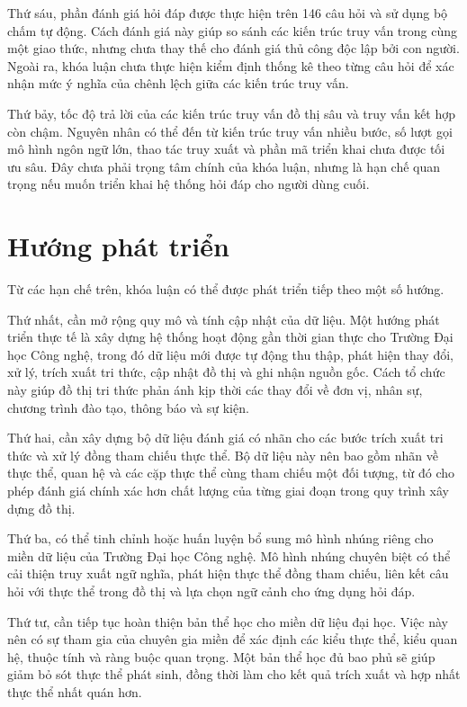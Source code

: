 Thứ sáu, phần đánh giá hỏi đáp được thực hiện trên 146 câu hỏi và sử dụng bộ chấm tự động. Cách đánh giá này giúp so sánh các kiến trúc truy vấn trong cùng một giao thức, nhưng chưa thay thế cho đánh giá thủ công độc lập bởi con người. Ngoài ra, khóa luận chưa thực hiện kiểm định thống kê theo từng câu hỏi để xác nhận mức ý nghĩa của chênh lệch giữa các kiến trúc truy vấn.

Thứ bảy, tốc độ trả lời của các kiến trúc truy vấn đồ thị sâu và truy vấn kết hợp còn chậm. Nguyên nhân có thể đến từ kiến trúc truy vấn nhiều bước, số lượt gọi mô hình ngôn ngữ lớn, thao tác truy xuất và phần mã triển khai chưa được tối ưu sâu. Đây chưa phải trọng tâm chính của khóa luận, nhưng là hạn chế quan trọng nếu muốn triển khai hệ thống hỏi đáp cho người dùng cuối.

\section{Hướng phát triển}

Từ các hạn chế trên, khóa luận có thể được phát triển tiếp theo một số hướng.

Thứ nhất, cần mở rộng quy mô và tính cập nhật của dữ liệu. Một hướng phát triển thực tế là xây dựng hệ thống hoạt động gần thời gian thực cho Trường Đại học Công nghệ, trong đó dữ liệu mới được tự động thu thập, phát hiện thay đổi, xử lý, trích xuất tri thức, cập nhật đồ thị và ghi nhận nguồn gốc. Cách tổ chức này giúp đồ thị tri thức phản ánh kịp thời các thay đổi về đơn vị, nhân sự, chương trình đào tạo, thông báo và sự kiện.

Thứ hai, cần xây dựng bộ dữ liệu đánh giá có nhãn cho các bước trích xuất tri thức và xử lý đồng tham chiếu thực thể. Bộ dữ liệu này nên bao gồm nhãn về thực thể, quan hệ và các cặp thực thể cùng tham chiếu một đối tượng, từ đó cho phép đánh giá chính xác hơn chất lượng của từng giai đoạn trong quy trình xây dựng đồ thị.

Thứ ba, có thể tinh chỉnh hoặc huấn luyện bổ sung mô hình nhúng riêng cho miền dữ liệu của Trường Đại học Công nghệ. Mô hình nhúng chuyên biệt có thể cải thiện truy xuất ngữ nghĩa, phát hiện thực thể đồng tham chiếu, liên kết câu hỏi với thực thể trong đồ thị và lựa chọn ngữ cảnh cho ứng dụng hỏi đáp.

Thứ tư, cần tiếp tục hoàn thiện bản thể học cho miền dữ liệu đại học. Việc này nên có sự tham gia của chuyên gia miền để xác định các kiểu thực thể, kiểu quan hệ, thuộc tính và ràng buộc quan trọng. Một bản thể học đủ bao phủ sẽ giúp giảm bỏ sót thực thể phát sinh, đồng thời làm cho kết quả trích xuất và hợp nhất thực thể nhất quán hơn.

